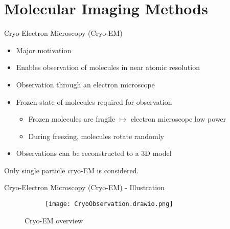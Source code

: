 
\section{Molecular Imaging Methods}	%

\begin{frame}[c]{Cryo-Electron Microscopy (Cryo-EM)}
    \begin{itemize}
        \item Major motivation
        \item Enables observation of molecules in near atomic resolution
        \item<2-> Observation through an electron microscope
        \item<2-> Frozen state of molecules required for observation
        \begin{itemize}
            \item<2-> Frozen molecules are fragile $\mapsto$ electron microscope low power
            \item<2-> During freezing, molecules rotate randomly
        \end{itemize}
        \item<2-> Observations can be reconstructed to a 3D model
    \end{itemize}

    \begin{tcolorbox}[colback=red!5!white,hide=<1-2>, alert=<3>, colframe=red!75!black]
        Only single particle cryo-EM is considered.
    \end{tcolorbox}

\end{frame}

\begin{frame}[c]{Cryo-Electron Microscopy (Cryo-EM) - Illustration}
    \begin{figure}
        \captionsetup[subfigure]{justification=centering}
        \centering
        \hfill
        \begin{subfigure}[t]{0.35\textwidth}
            \vskip 0pt
            \texttt{[image: CryoObservation.drawio.png]}
        \end{subfigure}\hfill
        \caption{Cryo-EM overview}
    \end{figure}

\end{frame}

